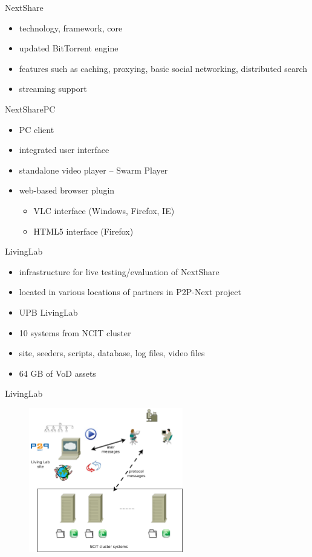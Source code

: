 \documentclass{beamer}
\begin{document}
\begin{frame}{NextShare}
  \begin{itemize}
    \item technology, framework, core
    \item updated BitTorrent engine
    \item features such as caching, proxying, basic social networking,
    distributed search
    \item streaming support
  \end{itemize}
\end{frame}

\begin{frame}{NextSharePC}
  \begin{itemize}
    \item PC client
    \item integrated user interface
    \item standalone video player -- Swarm Player
    \item web-based browser plugin
      \begin{itemize}
        \item VLC interface (Windows, Firefox, IE)
        \item HTML5 interface (Firefox)
      \end{itemize}
  \end{itemize}
\end{frame}

\begin{frame}{LivingLab}
  \begin{itemize}
    \item infrastructure for live testing/evaluation of NextShare
    \item located in various locations of partners in P2P-Next project
    \item UPB LivingLab
    \item 10 systems from NCIT cluster
    \item site, seeders, scripts, database, log files, video files
    \item 64 GB of VoD assets
  \end{itemize}
\end{frame}

\begin{frame}{LivingLab}
  \begin{figure}
    \includegraphics[width=0.6\textwidth]{img/upb-living-lab-components}
  \end{figure}
\end{frame}
\end{document}
